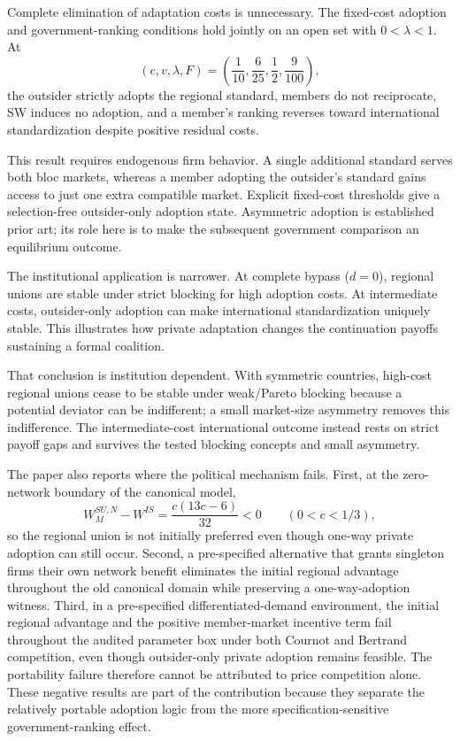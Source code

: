 Complete elimination of adaptation costs is unnecessary. The fixed-cost adoption and government-ranking conditions hold jointly on an open set with $0<\lambda<1$. At
\[
(c,v,\lambda,F)=\left(\frac1{10},\frac6{25},\frac12,\frac9{100}\right),
\]
the outsider strictly adopts the regional standard, members do not reciprocate, SW induces no adoption, and a member's ranking reverses toward international standardization despite positive residual costs.

This result requires endogenous firm behavior. A single additional standard serves both bloc markets, whereas a member adopting the outsider's standard gains access to just one extra compatible market. Explicit fixed-cost thresholds give a selection-free outsider-only adoption state. Asymmetric adoption is established prior art; its role here is to make the subsequent government comparison an equilibrium outcome.

The institutional application is narrower. At complete bypass ($d=0$), regional unions are stable under strict blocking for high adoption costs. At intermediate costs, outsider-only adoption can make international standardization uniquely stable. This illustrates how private adaptation changes the continuation payoffs sustaining a formal coalition.

That conclusion is institution dependent. With symmetric countries, high-cost regional unions cease to be stable under weak/Pareto blocking because a potential deviator can be indifferent; a small market-size asymmetry removes this indifference. The intermediate-cost international outcome instead rests on strict payoff gaps and survives the tested blocking concepts and small asymmetry.

The paper also reports where the political mechanism fails. First, at the zero-network boundary of the canonical model,
\[
W_M^{SU,N}-W^{IS}
=
\frac{c(13c-6)}{32}<0
\qquad (0<c<1/3),
\]
so the regional union is not initially preferred even though one-way private adoption can still occur. Second, a pre-specified alternative that grants singleton firms their own network benefit eliminates the initial regional advantage throughout the old canonical domain while preserving a one-way-adoption witness. Third, in a pre-specified differentiated-demand environment, the initial regional advantage and the positive member-market incentive term fail throughout the audited parameter box under both Cournot and Bertrand competition, even though outsider-only private adoption remains feasible. The portability failure therefore cannot be attributed to price competition alone. These negative results are part of the contribution because they separate the relatively portable adoption logic from the more specification-sensitive government-ranking effect.

